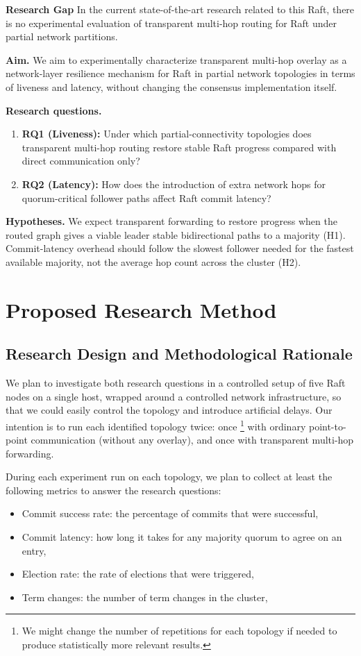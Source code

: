 \documentclass[11pt,a4paper]{article}
\begin{document}
\textbf{Research Gap}
In the current state-of-the-art research related to this Raft, there is no experimental evaluation of transparent multi-hop routing for Raft under partial network partitions.

\textbf{Aim.}
We aim to experimentally characterize transparent multi-hop overlay as a network-layer resilience mechanism for Raft in partial network topologies in terms of liveness and latency, without changing the consensus implementation itself.

\textbf{Research questions.}
\begin{enumerate}
  \item \textbf{RQ1 (Liveness):} Under which partial-connectivity topologies does transparent multi-hop routing restore stable Raft progress compared with direct communication only?
  \item \textbf{RQ2 (Latency):} How does the introduction of extra network hops for quorum-critical follower paths affect Raft commit latency?
\end{enumerate}

\textbf{Hypotheses.}
We expect transparent forwarding to restore progress when the routed graph gives a viable leader stable bidirectional paths to a majority (H1). Commit-latency overhead should follow the slowest follower needed for the fastest available majority, not the average hop count across the cluster (H2).

\section{Proposed Research Method}

\subsection{Research Design and Methodological Rationale}
We plan to investigate both research questions in a controlled setup of five Raft nodes on a single host, wrapped around a controlled network infrastructure, so that we could easily control the topology and introduce artificial delays.
Our intention is to run each identified topology twice: once \footnote{We might change the number of repetitions for each topology if needed to produce statistically more relevant results.} with ordinary point-to-point communication (without any overlay), and once with transparent multi-hop forwarding.

During each experiment run on each topology, we plan to collect at least the following metrics to answer the research questions:
\begin{itemize}
  \item Commit success rate: the percentage of commits that were successful,
  \item Commit latency: how long it takes for any majority quorum to agree on an entry,
  \item Election rate: the rate of elections that were triggered,
  \item Term changes: the number of term changes in the cluster,
\end{itemize}
\end{document}
